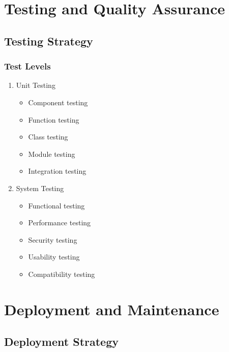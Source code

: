 \documentclass[12pt,a4paper]{report}
\begin{document}
\chapter{Testing and Quality Assurance}
\section{Testing Strategy}
\subsection{Test Levels}
\begin{enumerate}
    \item Unit Testing
    \begin{itemize}
        \item Component testing
        \item Function testing
        \item Class testing
        \item Module testing
        \item Integration testing
    \end{itemize}
    
    \item System Testing
    \begin{itemize}
        \item Functional testing
        \item Performance testing
        \item Security testing
        \item Usability testing
        \item Compatibility testing
    \end{itemize}
\end{enumerate}

\chapter{Deployment and Maintenance}
\section{Deployment Strategy}
\end{document}
